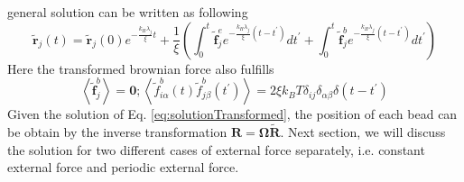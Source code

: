 \documentclass[12pt,a4paper]{article}
\begin{document}
general solution can be written as following
\begin{equation}
    \label{eq:solutionTransformed}
    \tilde{\mathbf{r}}_j(t) = \tilde{\mathbf{r}}_j(0) e^{-\frac{k_H
            \lambda_j}{\xi} t} + \frac{1}{\xi}
    \left(\int^t_0{\tilde{\mathbf{f}}^e_j e^{-\frac{k_H \lambda_j}{\xi} (t
                -t^\prime)}} dt^{\prime} + \int^t_0{\tilde{\mathbf{f}}^b_j
            e^{-\frac{k_H \lambda_j}{\xi} (t -t^\prime)} }dt^{\prime} \right)
\end{equation}
Here the transformed brownian force also fulfills 
\begin{equation}
    \label{eq:brownianTransformed}
    \left<\tilde{\mathbf{f}}_j^b\right> = \mathbf 0; 
    \left<\tilde{f}_{i\alpha}^b(t)\tilde{f}_{j\beta}^b(t^\prime)\right> = 2\xi
    k_B T \delta_{ij} \delta_{\alpha\beta}\delta(t-t^\prime)
\end{equation}
Given the solution of Eq. \eqref{eq:solutionTransformed}, the position of each
bead can be obtain by the inverse transformation $\mathbf{R} =
\mathbf{\Omega}\tilde{\mathbf{R}}$. Next section, we will discuss the solution
for two different cases of external force separately, i.e.  constant external
force and periodic external force.
\end{document}
